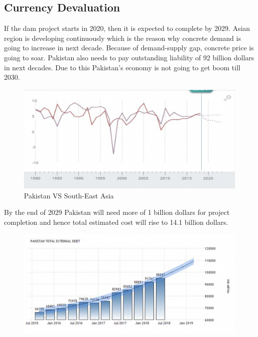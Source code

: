 \documentclass[11pt, journal,letterpaper,compsoc]{IEEEtran}
\begin{document}
\subsection{Currency Devaluation}
If the dam project starts in 2020, then it is expected to complete by 2029. Asian region is developing continuously which is the reason why concrete demand is going to increase in next decade. Because of demand-supply gap, concrete price is going to soar. Pakistan also needs to pay outstanding liability of 92 billion dollars in next decades. Due to this Pakistan’s economy is not going to get boom till 2030.

\begin{figure}  [h!]
\includegraphics[width=\linewidth]{images/pak-vs-asia}
 \caption{Pakistan VS South-East Asia}
\end{figure}

By the end of 2029 Pakistan will need more of 1 billion dollars for project completion and hence  total estimated cost will rise to 14.1 billion dollars.\\

\begin{figure}  [h!]
\includegraphics[width=\linewidth]{images/predicted-gdpa}

\end{figure}
\end{document}
